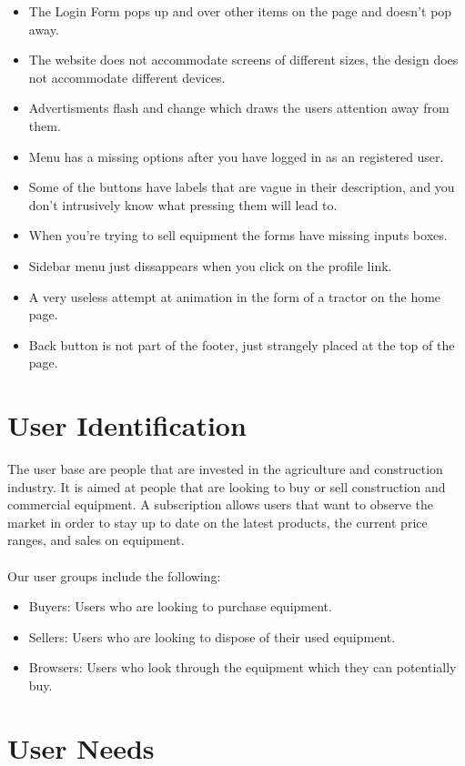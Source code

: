 \documentclass[11pt]{article}
\begin{document}
\begin{itemize}
	\item The Login Form pops up and over other items on the page and doesn’t pop away.
	\item The website does not accommodate screens of different sizes, the design does not accommodate different devices.
	\item Advertisments flash and change which draws the users attention away from them.
	\item Menu has a missing options after you have logged in as an registered user.
	\item Some of the buttons have labels that are vague in their description, and you don’t intrusively know what pressing them will lead to.
	\item When you're trying to sell equipment the forms have missing inputs boxes.
	\item Sidebar menu just dissappears when you click on the profile link.
	\item A very useless attempt at animation in the form of a tractor on the home page.
	\item Back button is not part of the footer, just strangely placed at the top of the page.
\end{itemize}

\section{User Identification}

The user base are people that are invested in the agriculture and construction industry. It is aimed at people that are looking to buy or sell construction and commercial equipment. A subscription allows users that want to observe the market in order to stay up to date on the latest products, the current price ranges, and sales on equipment.
\\ \\
Our user groups include the following:

\begin{itemize}
	\item Buyers: Users who are looking to purchase equipment.
	\item Sellers: Users who are looking to dispose of their used equipment.
	\item Browsers: Users who look through the equipment which they can potentially buy.
\end{itemize}

\section{User Needs}
\end{document}
